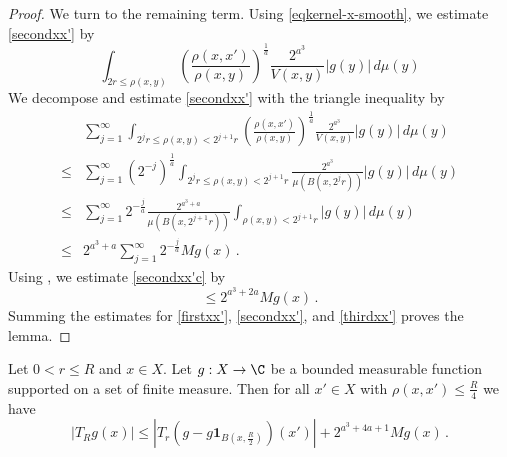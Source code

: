 \begin{proof}
We turn to the remaining term. Using \eqref{eqkernel-x-smooth}, we estimate \eqref{secondxx'} by
\begin{equation}\label{secondxx'b}
 \int_{2r\le\rho(x,y)} \left(\frac{\rho(x,x')}{\rho(x,y)}\right)^{\frac{1}{a}}\frac{2^{a^3}}{V(x,y)} |g(y)| \,d\mu(y)
\end{equation}
We decompose and estimate
\eqref{secondxx'}
with the triangle inequality by
\begin{align}
 &\sum_{j=1}^\infty  \int_{2^jr\le\rho(x,y)< 2^{j+1}r}
 \left(\frac{\rho(x,x')}{\rho(x,y)}\right)^{\frac{1}{a}}\frac{2^{a^3}}{V(x,y)} |g(y)| \,d\mu(y)\, \\
 \le&
 \sum_{j=1}^\infty \left( 2^{-j} \right)^{\frac{1}{a}} \int_{2^jr\le\rho(x,y)< 2^{j+1}r} \frac{2^{a^3}}{\mu(B(x,2^j r))} |g(y)| \,d\mu(y) \\
 \le&
\sum_{j=1}^\infty 2^{-\frac{j}{a}} \frac{2^{a^3 + a}}{\mu(B(x,2^{j+1} r))} \int_{\rho(x,y)<2^{j+1}r}
|g(y)| \, d\mu(y) \\
\label{secondxx'c}
\le& 2^{a^3 + a} \sum_{j=1}^\infty 2^{-\frac{j}{a}} Mg(x)\,.
\end{align}
Using , we estimate
\eqref{secondxx'c} by
\begin{equation}\label{secondxx'd}
\le 2^{a^3 + 2a} Mg(x) \,.
\end{equation}
Summing the estimates
for \eqref{firstxx'},
\eqref{secondxx'}, and
\eqref{thirdxx'}
proves the lemma.
\end{proof}

\begin{lemma}
\label{Cotlar-control}
Let $0<r\le R$ and  $x\in X$. Let $g:X\to\C$ be a bounded measurable function supported on a set of finite measure.
Then for all $x'\in X$ with $\rho(x,x')\le\frac {R}{4}$ we have
\begin{equation}\label{eq-cotlar-control}
\left|T_R g(x)
\right|\le
|T_r(g-g\mathbf{1}_{B(x,\frac {R} 2)})(x')| +
2^{a^3 + 4a + 1} Mg(x)\, .
\end{equation}
\end{lemma}

